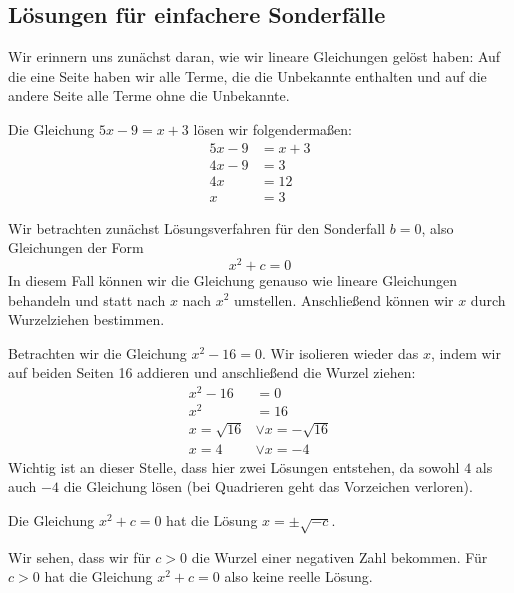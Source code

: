 \documentclass[../../main.tex]{subfiles}
\begin{document}
\subsection{Lösungen für einfachere Sonderfälle}
Wir erinnern uns zunächst daran, wie wir lineare Gleichungen gelöst haben: Auf die eine Seite haben wir alle Terme, die die Unbekannte enthalten und auf die andere Seite alle Terme ohne die Unbekannte.
\begin{example}
Die Gleichung $5x-9=x+3$ lösen wir folgendermaßen:
\begin{equation*}\begin{split}
    5x-9&=x+3\\
    4x-9&=3\\
    4x&=12\\
    x&=3
\end{split}\end{equation*}
\end{example}
\noindent Wir betrachten zunächst Lösungsverfahren für den Sonderfall $b=0$, also Gleichungen der Form
\[x^2+c=0\]
\noindent In diesem Fall können wir die Gleichung genauso wie lineare Gleichungen behandeln und statt nach $x$ nach $x^2$ umstellen. Anschließend können wir $x$ durch Wurzelziehen bestimmen.
\begin{example}
Betrachten wir die Gleichung $x^2-16=0$. Wir isolieren wieder das $x$, indem wir auf beiden Seiten 16 addieren und anschließend die Wurzel ziehen:
\begin{equation*}\begin{split}
x^2-16&=0\\
x^2&=16\\
x=\sqrt{16}&\lor x=-\sqrt{16}\\
x=4&\lor x=-4
\end{split}\end{equation*}
Wichtig ist an dieser Stelle, dass hier zwei Lösungen entstehen, da sowohl $4$  als auch $-4$ die Gleichung lösen (bei Quadrieren geht das Vorzeichen verloren).
\end{example}
\begin{theorem}
Die Gleichung $x^2+c=0$ hat die Lösung $x=\pm\sqrt{-c}$.
\end{theorem}
\noindent Wir sehen, dass wir für $c>0$ die Wurzel einer negativen Zahl bekommen. Für $c>0$ hat die Gleichung $x^2+c=0$ also keine reelle Lösung.
\end{document}
